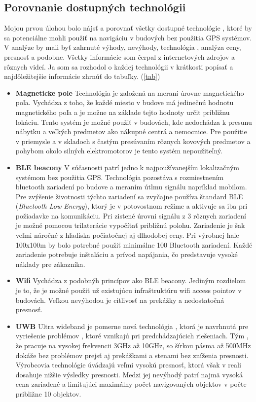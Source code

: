 \documentclass[11pt, oneside]{report}
\begin{document}
\subsection{Porovnanie dostupných technológii}
Mojou prvou úlohou bolo nájsť a  porovnať všetky dostupné technológie , ktoré  by sa potenciálne mohli použiť na navigáciu v budových bez použitia GPS systémov. V analýze by mali byť zahrnuté  výhody, nevýhody,  technológia , analýza ceny, presnosť a podobne. Všetky informácie som čerpal z internetových zdrojov a rôznych videí. Ja som sa rozhodol o každej technológii  v krátkosti popísať a najdôležitejšie informácie zhrnúť do tabuľky. (\ref{tab})
\begin{itemize}
\item\textbf{Magneticke pole} Technológia je založená na  meraní úrovne magnetického poľa. Vychádza z toho, že každé miesto v budove má jedinečnú hodnotu magnetického poľa a je možne na základe tejto hodnoty určit   približnu lokáciu. Tento systém je možné použiť v budovách, kde nedochádza k  presunu nábytku a  veľkých predmetov ako nákupné centrá a nemocnice. Pre použitie v priemysle a v skladoch  s častým presúvaním rôznych kovových predmetov  a pohybom okolo silných elektromotorov je tento systém nepoužiteľný.
\item\textbf{BLE beacony} V súčasnosti patrí jedno k najpoužívanejším  lokalizačným systémom  bez použitia GPS. Technológia pozostáva  s rozmiestnením bluetooth zariadení po budove a meraním útlmu signálu  napríklad mobilom. Pre zvýšenie životnosti týchto zariadení sa zvyčajne používa štandard BLE (\textit{Bluetooth Low Energy}), ktorý je v potovostnom režime a aktivuje sa iba pri požiadavke na komunikáciu. Pri  zistené úrovni signálu z  3 rôznych zariadení je možné pomocou trilaterácie vypočítať približnú polohu. Zariadenie je šak veľmi náročné z hľadiska počiatočnej aj dlhodobej  ceny. Pri výrobnej hale  100x100m by bolo potrebné použiť minimálne 100 Bluetooth zariadení. Každé zariadenie potrebuje inštaláciu a prívod napájania, čo predstavuje vysoké náklady pre zákazníka. 
\item\textbf{Wifi} Vychádza z podobnýh princípov ako BLE beacony. Jediným rozdielom je to, že je možné použiť už existujúcu infraštruktúru wifi access pointov v budovách. Veľkou nevýhodou je citlivosť na prekážky a nedostatočná presnosť.
\item\textbf{UWB} Ultra wideband je  pomerne nová technológia , ktorá je  navrhnutá pre vyriešenie problémov , ktoré vznikajú pri predchádzajúcich riešeniach. Tým , že pracuje na  vysokej frekvencii 3GHz až 10GHz, so šírkou pásma až 500MHz dokáže  bez problémov prejsť aj prekážkami a stenami bez zníženia presnosti. Výrobcovia technológie úvádzajú veľmi vysokú presnosť, ktorá však v reali dosahuje nižšie výsledky presnosti. Medzi jej nevýhodý patrí najmä vysoká cena zariadené a limitujúci maximálny počet  navigovaných objektov v počte približne 10 objektov.

\end{itemize}
\end{document}
